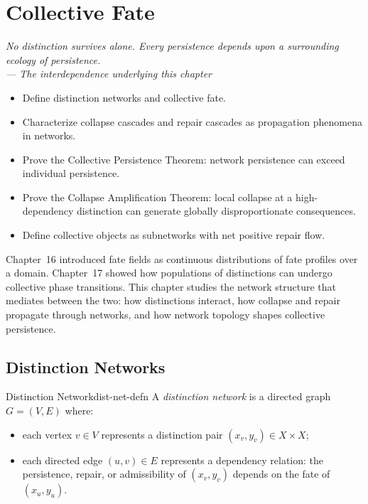 \documentclass[12pt,twoside,openright]{book}
\newenvironment{epigraph}[2]{%
  \vspace{1em}\begin{flushright}
  \begin{minipage}{0.72\textwidth}
  \itshape\small #1\\[0.4em]
  \upshape\footnotesize\sffamily\color{DistGray}--- #2
  \end{minipage}\end{flushright}\vspace{1.5em}}{}
\newenvironment{objectives}{%
  \begin{tcolorbox}[colback=DistBlue!5,colframe=DistBlue,
    title={\faCheckCircle\enspace Chapter Objectives},
    fonttitle=\sffamily\bfseries\color{white},
    attach boxed title to top left={yshift=-2mm,xshift=4mm},
    boxed title style={colback=DistBlue},breakable]
  \begin{itemize}[leftmargin=*,nosep]}{%
  \end{itemize}\end{tcolorbox}\vspace{1em}}
\providecommand{\distNet}{G}
\providecommand{\distNetV}{V}
\providecommand{\distNetE}{E}
\begin{document}

\chapter{Collective Fate}
\label{ch:collective-fate}

\begin{epigraph}{No distinction survives alone. Every persistence
  depends upon a surrounding ecology of persistence.}%
  {The interdependence underlying this chapter}
\end{epigraph}

\begin{objectives}
\item Define distinction networks and collective fate.
\item Characterize collapse cascades and repair cascades as
  propagation phenomena in networks.
\item Prove the Collective Persistence Theorem: network
  persistence can exceed individual persistence.
\item Prove the Collapse Amplification Theorem: local collapse
  at a high-dependency distinction can generate globally
  disproportionate consequences.
\item Define collective objects as subnetworks with net
  positive repair flow.
\end{objectives}

Chapter~16 introduced fate fields as continuous distributions
of fate profiles over a domain. Chapter~17 showed how
populations of distinctions can undergo collective phase
transitions. This chapter studies the network structure that
mediates between the two: how distinctions interact, how
collapse and repair propagate through networks, and how
network topology shapes collective persistence.

\section{Distinction Networks}

\begin{definition}{Distinction Network}{dist-net-defn}
A \emph{distinction network} is a directed graph
$\distNet=(\distNetV,\distNetE)$ where:
\begin{itemize}[nosep,leftmargin=2em]
  \item each vertex $v\in\distNetV$ represents a distinction
    pair $(x_v,y_v)\in X\times X$;
  \item each directed edge $(u,v)\in\distNetE$ represents a
    dependency relation: the persistence, repair, or
    admissibility of $(x_v,y_v)$ depends on the fate of
    $(x_u,y_u)$.
\end{itemize}
\end{definition}
\end{document}
